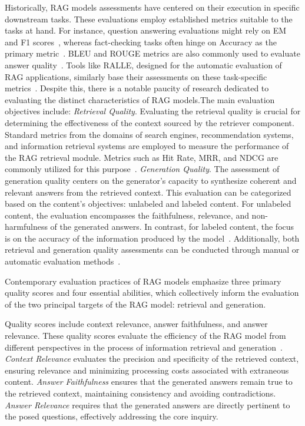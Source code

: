 Historically, RAG models assessments have centered on their execution in specific downstream tasks. These evaluations employ established metrics suitable to the tasks at hand. For instance, question answering evaluations might rely on EM and F1 scores~, whereas fact-checking tasks often hinge on Accuracy as the primary metric~. BLEU and ROUGE metrics are also commonly used to evaluate answer quality~. Tools like RALLE, designed for the automatic evaluation of RAG applications, similarly base their assessments on these task-specific metrics~. Despite this, there is a notable paucity of research dedicated to evaluating the distinct characteristics of RAG models.The main evaluation objectives include:
\emph{Retrieval Quality}. Evaluating the retrieval quality is crucial for determining the effectiveness of the context sourced by the retriever component. Standard metrics from the domains of search engines, recommendation systems, and information retrieval systems are employed to measure the performance of the RAG retrieval module. Metrics such as Hit Rate, MRR, and NDCG are commonly utilized for this purpose~.
\emph{Generation Quality}. The assessment of generation quality centers on the generator's capacity to synthesize coherent and relevant answers from the retrieved context. This evaluation can be categorized based on the content's objectives: unlabeled and labeled content. For unlabeled content, the evaluation encompasses the faithfulness, relevance, and non-harmfulness of the generated answers. In contrast, for labeled content, the focus is on the accuracy of the information produced by the model~. Additionally, both retrieval and generation quality assessments can be conducted through manual or automatic evaluation methods~.

Contemporary evaluation practices of RAG models emphasize three primary quality scores and four essential abilities, which collectively inform the evaluation of the two principal targets of the RAG model: retrieval and generation.

Quality scores include context relevance, answer faithfulness, and answer relevance. These quality scores evaluate the efficiency of the RAG model from different perspectives in the process of information retrieval and generation~. 
\emph{Context Relevance} evaluates the precision and specificity of the retrieved context, ensuring relevance and minimizing processing costs associated with extraneous content.
\emph{Answer Faithfulness} ensures that the generated answers remain true to the retrieved context, maintaining consistency and avoiding contradictions.
\emph{Answer Relevance} requires that the generated answers are directly pertinent to the posed questions, effectively addressing the core inquiry.

